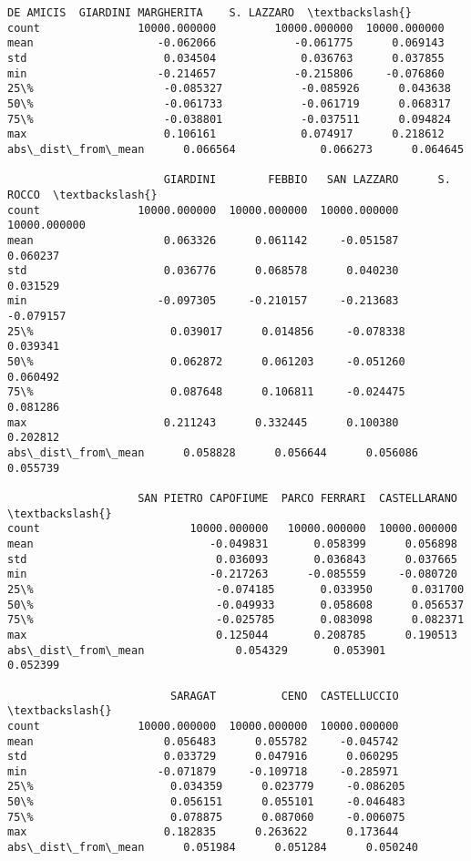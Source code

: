 \documentclass[11pt]{article}
\begin{document}
\begin{tcolorbox}[breakable, size=fbox, boxrule=.5pt, pad at break*=1mm, opacityfill=0]
\begin{Verbatim}[commandchars=\\\{\}]
                       DE AMICIS  GIARDINI MARGHERITA    S. LAZZARO  \textbackslash{}
count               10000.000000         10000.000000  10000.000000
mean                   -0.062066            -0.061775      0.069143
std                     0.034504             0.036763      0.037855
min                    -0.214657            -0.215806     -0.076860
25\%                    -0.085327            -0.085926      0.043638
50\%                    -0.061733            -0.061719      0.068317
75\%                    -0.038801            -0.037511      0.094824
max                     0.106161             0.074917      0.218612
abs\_dist\_from\_mean      0.066564             0.066273      0.064645

                        GIARDINI        FEBBIO   SAN LAZZARO      S. ROCCO  \textbackslash{}
count               10000.000000  10000.000000  10000.000000  10000.000000
mean                    0.063326      0.061142     -0.051587      0.060237
std                     0.036776      0.068578      0.040230      0.031529
min                    -0.097305     -0.210157     -0.213683     -0.079157
25\%                     0.039017      0.014856     -0.078338      0.039341
50\%                     0.062872      0.061203     -0.051260      0.060492
75\%                     0.087648      0.106811     -0.024475      0.081286
max                     0.211243      0.332445      0.100380      0.202812
abs\_dist\_from\_mean      0.058828      0.056644      0.056086      0.055739

                    SAN PIETRO CAPOFIUME  PARCO FERRARI  CASTELLARANO  \textbackslash{}
count                       10000.000000   10000.000000  10000.000000
mean                           -0.049831       0.058399      0.056898
std                             0.036093       0.036843      0.037665
min                            -0.217263      -0.085559     -0.080720
25\%                            -0.074185       0.033950      0.031700
50\%                            -0.049933       0.058608      0.056537
75\%                            -0.025785       0.083098      0.082371
max                             0.125044       0.208785      0.190513
abs\_dist\_from\_mean              0.054329       0.053901      0.052399

                         SARAGAT          CENO  CASTELLUCCIO  \textbackslash{}
count               10000.000000  10000.000000  10000.000000
mean                    0.056483      0.055782     -0.045742
std                     0.033729      0.047916      0.060295
min                    -0.071879     -0.109718     -0.285971
25\%                     0.034359      0.023779     -0.086205
50\%                     0.056151      0.055101     -0.046483
75\%                     0.078875      0.087060     -0.006075
max                     0.182835      0.263622      0.173644
abs\_dist\_from\_mean      0.051984      0.051284      0.050240


\end{Verbatim}
\end{tcolorbox}
\end{document}
